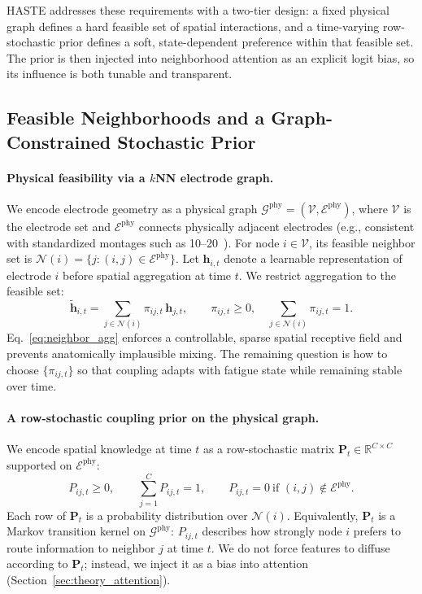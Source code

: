 \documentclass[preprint,12pt]{elsarticle}
\begin{document}
HASTE addresses these requirements with a two-tier design:
a fixed physical graph defines a hard feasible set of spatial interactions,
and a time-varying row-stochastic prior defines a soft, state-dependent preference within that feasible set.
The prior is then injected into neighborhood attention as an explicit logit bias, so its influence is both tunable and transparent.

\subsection{Feasible Neighborhoods and a Graph-Constrained Stochastic Prior}
\label{sec:theory_formulation}

\paragraph{Physical feasibility via a $k$NN electrode graph.}
We encode electrode geometry as a physical graph
$\mathcal{G}^{\mathrm{phy}}=(\mathcal{V},\mathcal{E}^{\mathrm{phy}})$, where $\mathcal{V}$ is the electrode set and
$\mathcal{E}^{\mathrm{phy}}$ connects physically adjacent electrodes (e.g., consistent with standardized montages such as 10--20~\cite{Klem1999TenTwenty}).
For node $i\in\mathcal{V}$, its feasible neighbor set is
$\mathcal{N}(i)=\{j:(i,j)\in\mathcal{E}^{\mathrm{phy}}\}$.
Let $\mathbf{h}_{i,t}$ denote a learnable representation of electrode $i$ before spatial aggregation at time $t$.
We restrict aggregation to the feasible set:
\begin{equation}
\tilde{\mathbf{h}}_{i,t}
=
\sum_{j\in\mathcal{N}(i)}\pi_{ij,t}\,\mathbf{h}_{j,t},
\qquad
\pi_{ij,t}\ge 0,\quad
\sum_{j\in\mathcal{N}(i)}\pi_{ij,t}=1.
\label{eq:neighbor_agg}
\end{equation}
Eq.~\eqref{eq:neighbor_agg} enforces a controllable, sparse spatial receptive field and prevents anatomically implausible mixing.
The remaining question is how to choose $\{\pi_{ij,t}\}$ so that coupling adapts with fatigue state while remaining stable over time.

\paragraph{A row-stochastic coupling prior on the physical graph.}
We encode spatial knowledge at time $t$ as a row-stochastic matrix
$\mathbf{P}_t\in\mathbb{R}^{C\times C}$ supported on $\mathcal{E}^{\mathrm{phy}}$:
\begin{equation}
P_{ij,t}\ge 0,\qquad
\sum_{j=1}^{C}P_{ij,t}=1,\qquad
P_{ij,t}=0\ \text{if } (i,j)\notin\mathcal{E}^{\mathrm{phy}}.
\label{eq:prior_stochastic}
\end{equation}
Each row of $\mathbf{P}_t$ is a probability distribution over $\mathcal{N}(i)$.
Equivalently, $\mathbf{P}_t$ is a Markov transition kernel on $\mathcal{G}^{\mathrm{phy}}$:
$P_{ij,t}$ describes how strongly node $i$ prefers to route information to neighbor $j$ at time $t$.
We do not force features to diffuse according to $\mathbf{P}_t$; instead, we inject it as a bias into attention (Section~\ref{sec:theory_attention}).
\end{document}
